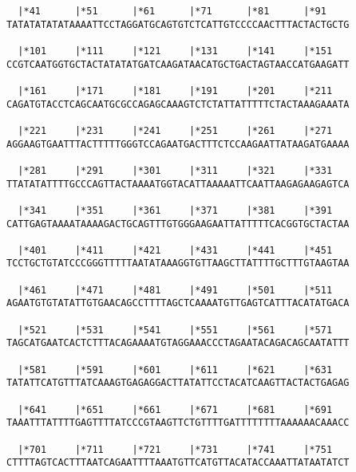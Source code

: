 \documentclass{article}
\begin{document}
\begin{Verbatim}
  |*41      |*51      |*61      |*71      |*81      |*91    
TATATATATATAAAATTCCTAGGATGCAGTGTCTCATTGTCCCCAACTTTACTACTGCTG
                                                            
  |*101     |*111     |*121     |*131     |*141     |*151   
CCGTCAATGGTGCTACTATATATGATCAAGATAACATGCTGACTAGTAACCATGAAGATT
                                                            
  |*161     |*171     |*181     |*191     |*201     |*211   
CAGATGTACCTCAGCAATGCGCCAGAGCAAAGTCTCTATTATTTTTCTACTAAAGAAATA
                                                            
  |*221     |*231     |*241     |*251     |*261     |*271   
AGGAAGTGAATTTACTTTTTGGGTCCAGAATGACTTTCTCCAAGAATTATAAGATGAAAA
                                                            
  |*281     |*291     |*301     |*311     |*321     |*331   
TTATATATTTTGCCCAGTTACTAAAATGGTACATTAAAAATTCAATTAAGAGAAGAGTCA
                                                            
  |*341     |*351     |*361     |*371     |*381     |*391   
CATTGAGTAAAATAAAAGACTGCAGTTTGTGGGAAGAATTATTTTTCACGGTGCTACTAA
                                                            
  |*401     |*411     |*421     |*431     |*441     |*451   
TCCTGCTGTATCCCGGGTTTTTAATATAAAGGTGTTAAGCTTATTTTGCTTTGTAAGTAA
                                                            
  |*461     |*471     |*481     |*491     |*501     |*511   
AGAATGTGTATATTGTGAACAGCCTTTTAGCTCAAAATGTTGAGTCATTTACATATGACA
                                                            
  |*521     |*531     |*541     |*551     |*561     |*571   
TAGCATGAATCACTCTTTACAGAAAATGTAGGAAACCCTAGAATACAGACAGCAATATTT
                                                            
  |*581     |*591     |*601     |*611     |*621     |*631   
TATATTCATGTTTATCAAAGTGAGAGGACTTATATTCCTACATCAAGTTACTACTGAGAG
                                                            
  |*641     |*651     |*661     |*671     |*681     |*691   
TAAATTTATTTTGAGTTTTATCCCGTAAGTTCTGTTTTGATTTTTTTTAAAAAACAAACC
                                                            
  |*701     |*711     |*721     |*731     |*741     |*751   
CTTTTAGTCACTTTAATCAGAATTTTAAATGTTCATGTTACATACCAAATTATAATATCT
                                                            

\end{Verbatim}
\end{document}
